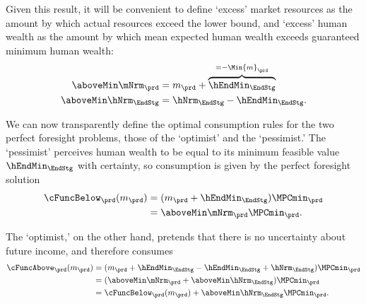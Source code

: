 \documentclass[titlepage, headings=optiontotocandhead]{econark}
\begin{document}
  Given this result, it will be convenient to define `excess' market
  resources as the amount by which actual resources exceed the lower
  bound, and `excess' human wealth as the amount by which mean expected human wealth
  exceeds guaranteed minimum human wealth:
  \begin{equation*}\begin{gathered}\begin{aligned}
        \aboveMin \mNrm_{\prd}  & = m_{\prd}+\overbrace{\hEndMin_{\EndStg}}^{=-\Min{m}_{\prd}}
        \\  \aboveMin \hNrm_{\EndStg}  & = \hNrm_{\EndStg}-\hEndMin_{\EndStg}.
      \end{aligned}\end{gathered}\end{equation*}

  We can now transparently define the optimal
  consumption rules for the two perfect foresight problems, those of the
  `optimist' and the `pessimist.'  The `pessimist' perceives human
  wealth to be equal to its minimum feasible value $\hEndMin_{\EndStg}$ with certainty, so
  consumption is given by the perfect foresight solution
  \begin{equation*}\begin{gathered}\begin{aligned}
        \cFuncBelow_{\prd}(m_{\prd})  & = (m_{\prd}+\hEndMin_{\EndStg})\MPCmin_{\prd}
        \\  & = \aboveMin \mNrm_{\prd}\MPCmin_{\prd}
        .
      \end{aligned}\end{gathered}\end{equation*}

  The `optimist,' on the other hand, pretends that there is no uncertainty
  about future income, and therefore consumes
  \begin{equation*}\begin{gathered}\begin{aligned}
        \cFuncAbove_{\prd}(m_{\prd})  & = (m_{\prd} +\hEndMin_{\EndStg} - \hEndMin_{\EndStg} + \hNrm_{\EndStg} )\MPCmin_{\prd}
        \\    & = (\aboveMin \mNrm_{\prd} + \aboveMin \hNrm_{\EndStg})\MPCmin_{\prd}
        \\      & = \cFuncBelow_{\prd}(m_{\prd})+\aboveMin \hNrm_{\EndStg} \MPCmin_{\prd}
        .
      \end{aligned}\end{gathered}\end{equation*}
\end{document}
